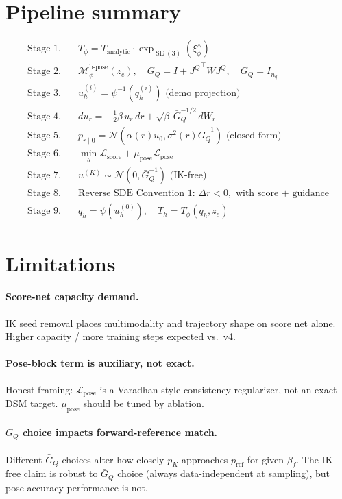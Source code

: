 \documentclass[11pt,a4paper]{article}
\DeclareMathOperator{\SE}{SE}
\newcommand{\N}{\mathcal{N}}
\newcommand{\Loss}{\mathcal{L}}
\newcommand{\Mbpose}{\mathcal{M}_\phi^{\text{b-pose}}}
\newcommand{\Tphi}{T_\phi}
\newcommand{\JQ}{J^Q}
\newcommand{\GQ}{G_Q}
\newcommand{\GQbar}{\bar G_Q}
\begin{document}
\section{Pipeline summary}

\begin{align}
\text{Stage 1.}\quad & \Tphi = T_\text{analytic} \cdot \exp_{\SE(3)}(\xi_\phi^\wedge) \\
\text{Stage 2.}\quad & \Mbpose(z_e), \quad \GQ = I + {\JQ}^\top W \JQ, \quad \GQbar = I_{n_q} \\
\text{Stage 3.}\quad & u_h^{(i)} = \psi^{-1}(q_h^{(i)}) \text{ (demo projection)} \\
\text{Stage 4.}\quad & du_r = -\tfrac{1}{2}\beta\, u_r\, dr + \sqrt{\beta}\, \GQbar^{-1/2}\, dW_r \\
\text{Stage 5.}\quad & p_{r \mid 0} = \N(\alpha(r) u_0, \sigma^2(r) \GQbar^{-1}) \text{ (closed-form)} \\
\text{Stage 6.}\quad & \min_\theta \Loss_\text{score} + \mu_\text{pose} \Loss_\text{pose} \\
\text{Stage 7.}\quad & u^{(K)} \sim \N(0, \GQbar^{-1}) \text{ (IK-free)} \\
\text{Stage 8.}\quad & \text{Reverse SDE Convention 1: } \Delta r < 0, \text{ with score + guidance} \\
\text{Stage 9.}\quad & q_h = \psi(u_h^{(0)}), \quad T_h = \Tphi(q_h, z_e)
\end{align}

\section{Limitations}

\paragraph{Score-net capacity demand.} IK seed removal places multimodality and trajectory shape on score net alone. Higher capacity / more training steps expected vs.\ v4.

\paragraph{Pose-block term is auxiliary, not exact.} Honest framing: $\Loss_\text{pose}$ is a Varadhan-style consistency regularizer, not an exact DSM target. $\mu_\text{pose}$ should be tuned by ablation.

\paragraph{$\GQbar$ choice impacts forward-reference match.} Different $\GQbar$ choices alter how closely $p_K$ approaches $p_\text{ref}$ for given $\beta_f$. The IK-free claim is robust to $\GQbar$ choice (always data-independent at sampling), but pose-accuracy performance is not.
\end{document}
